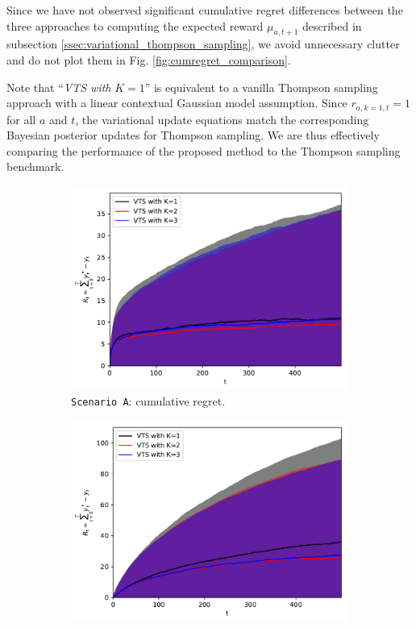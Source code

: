 \documentclass[10pt]{article}
\begin{document}
Since we have not observed significant cumulative regret differences between the three approaches to computing the expected reward $\mu_{a,t+1}$ described in subsection \ref{ssec:variational_thompson_sampling}, we avoid unnecessary clutter and do not plot them in Fig. \ref{fig:cumregret_comparison}.

Note that ``\textit{VTS with }$K=1$'' is equivalent to a vanilla Thompson sampling approach with a linear contextual Gaussian model assumption. Since $r_{a,k=1,t}=1$ for all $a$ and $t$, the variational update equations match the corresponding Bayesian posterior updates for Thompson sampling. We are thus effectively comparing the performance of the proposed method to the Thompson sampling benchmark.

\begin{figure}[!h]
	\centering
	\begin{subfigure}[b]{0.48\textwidth}
		\includegraphics[width=\textwidth]{./figs/model_a_cumregret.pdf}
		\caption{\texttt{Scenario A}: cumulative regret.}
		\label{fig:model_a_cumregret}
	\end{subfigure}
	\begin{subfigure}[b]{0.49\textwidth}
		\includegraphics[width=\textwidth]{./figs/model_b_cumregret.pdf}

\end{subfigure}
\end{figure}
\end{document}
